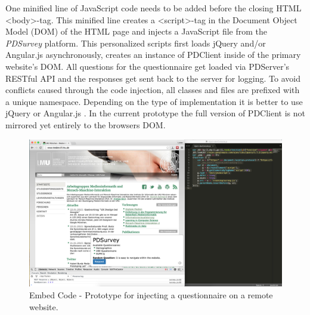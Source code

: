 		One minified line of JavaScript code needs to be added before the closing HTML <body>-tag. This minified line creates a <script>-tag in the Document Object Model (DOM) of the HTML page and injects a JavaScript file from the \textit{PDSurvey} platform. This personalized scripts first loads jQuery and/or Angular.js asynchronously, creates an instance of PDClient inside of the primary website's DOM. All questions for the questionnaire get loaded via PDServer's RESTful API and the responses get sent back to the server for logging. To avoid conflicts caused through the code injection, all classes and files are prefixed with a unique namespace. Depending on the type of implementation it is better to use jQuery or Angular.js \cite{AirPair2014jQueryAngular}. In the current prototype the full version of PDClient is not mirrored yet entirely to the browsers DOM.


	\begin{figure}
	    \begin{center}
	   \includegraphics[width=.8\columnwidth]{img/screenshots/pdsurvey-overview/injection.png}
	    \end{center}
	 \caption[Embed Code]{Embed Code - Prototype for injecting a questionnaire on a remote website.}
	 \label{fig:4-embed-code}
	\end{figure}
